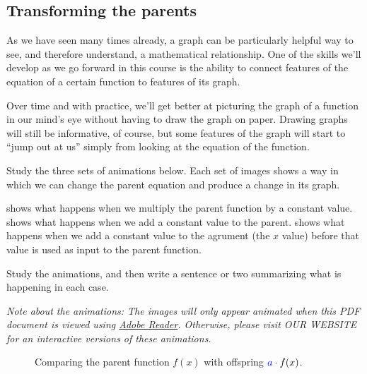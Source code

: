 \subsection{Transforming the parents}

As we have seen many times already, a graph can be particularly helpful way to see, and therefore understand, a mathematical relationship. One of the skills we'll develop as we go forward in this course is the ability to connect features of the equation of a certain function to features of its graph.

Over time and with practice, we'll get better at picturing the graph of a function in our mind's eye without having to draw the graph on paper. Drawing graphs will still be informative, of course, but some features of the graph will start to ``jump out at us'' simply from looking at the equation of the function.

\begin{boxedexplore}
Study the three sets of animations below. Each set of images shows a way in which we can change the parent equation and produce a change in its graph.

 shows what happens when we multiply the parent function by a constant value.  shows what happens when we add a constant value to the parent.  shows what happens when we add a constant value to the agrument (the $x$ value) before that value is used as input to the parent function.

Study the animations, and then write a sentence or two summarizing what is happening in each case.

\textit{Note about the animations: The images will only appear animated when this PDF document is viewed using \href{http://get.adobe.com/reader/}{Adobe Reader}. Otherwise, please visit OUR WEBSITE for an interactive versions of these animations.}

\end{boxedexplore}

\newcommand{\animscale}{0.45}
\begin{figure}
\begin{minipage}{0.32\linewidth}
	\centering
	\animategraphics[scale=\animscale]{6}{anim/linea}{}{}
\end{minipage}
%
\begin{minipage}{0.32\linewidth}
	\centering
	\animategraphics[scale=\animscale]{6}{anim/expoa}{}{}
\end{minipage}
%
\begin{minipage}{0.32\linewidth}
	\centering
	\animategraphics[scale=\animscale]{6}{anim/quada}{}{}
\end{minipage}
\caption{Comparing the parent function $f(x)$ with offspring ${\color{blue}a}\cdot f(x)$.}
\label{fig:transa}
\end{figure}


